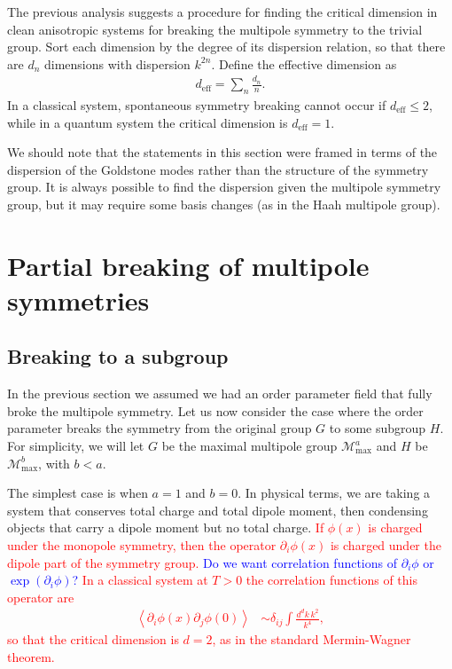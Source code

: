 \documentclass[pra,aps,twocolumn, amsfonts,amsmath,amssymb,nofootinbib,superscriptaddress]{revtex4}
\newcommand{\note}[1]{\textcolor{red}{#1}}
\newcommand{\charlie}[1]{\textcolor{Blue}{#1}}
\newcommand{\eff}{\text{eff}}
\begin{document}
The previous analysis suggests a procedure for finding the critical dimension in clean anisotropic systems for breaking the multipole symmetry to the trivial group. Sort each dimension by the degree of its dispersion relation, so that there are $d_n$ dimensions with dispersion $k^{2n}$. Define the effective dimension as 
\begin{align}
d_\eff = \sum_n \frac{d_n}{n}.
\end{align}
In a classical system, spontaneous symmetry breaking cannot occur if $d_\eff\le 2$, while in a quantum system the critical dimension is $d_\eff = 1$.

We should note that the statements in this section were framed in terms of the dispersion of the Goldstone modes rather than the structure of the symmetry group. It is always possible to find the dispersion given the multipole symmetry group, but it may require some basis changes (as in the Haah multipole group).

\section{Partial breaking of multipole symmetries} \label{sec:partial}

\subsection{Breaking to a subgroup} \label{sub:subgroup}

In the previous section we assumed we had an order parameter field that fully broke the multipole symmetry. Let us now consider the case where the order parameter breaks the symmetry from the original group $G$ to some subgroup $H$. For simplicity, we will let $G$ be the maximal multipole group $\mathcal{M}^{a}_\text{max}$ and $H$ be $\mathcal{M}^b_\text{max}$, with $b<a$. 

The simplest case is when $a=1$ and $b=0$. In physical terms, we are taking a system that conserves total charge and total dipole moment, then condensing objects that carry a dipole moment but no total charge. \note{If $\phi(x)$ is charged under the monopole symmetry, then the operator $\partial_i \phi(x)$ is charged under the dipole part of the symmetry group. \charlie{Do we want correlation functions of $\partial_i\phi$ or $\exp(\partial_i\phi)$?} In a classical system at $T>0$ the correlation functions of this operator are
\begin{align}
\left\langle \partial_i\phi(x) \partial_j\phi(0) \right\rangle &\sim \delta_{ij} \int \frac{d^dk\, k^2}{k^4},
\end{align}
so that the critical dimension is $d=2$, as in the standard Mermin-Wagner theorem. }
\end{document}
